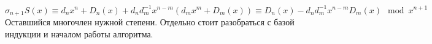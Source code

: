 $$\sigma_{n+1}S(x)\equiv d_n x^n+ 
D_n(x)+ d_nd_m^{-1}x^{n-m}(d_mx^m+ D_m(x)) \equiv D_n(x)-d_nd_m^{-1}x^{n-m}D_m(x) \mod x^{n+1}
$$
Оставшийся многочлен нужной степени. Отдельно стоит разобраться с базой индукции и началом работы алгоритма.
 

\endproof





